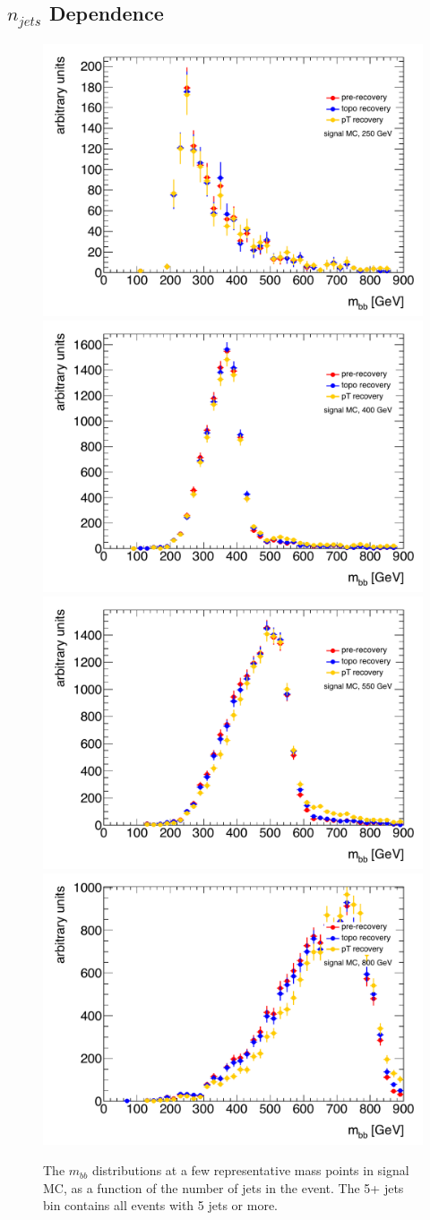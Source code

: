 \subsection{$n_{jets}$ Dependence} 
\begin{figure}[hbt]
  \includegraphics[width=0.45\linewidth]{SignalKin/fsr_recovery_bAbb_250.pdf}
  \includegraphics[width=0.45\linewidth]{SignalKin/fsr_recovery_bAbb_400.pdf}
\newline
  \includegraphics[width=0.45\linewidth]{SignalKin/fsr_recovery_bAbb_550.pdf}
  \includegraphics[width=0.45\linewidth]{SignalKin/fsr_recovery_bAbb_800.pdf}
  \label{fig:mbb_njets_signal}
  \caption{The $m_{bb}$ distributions at a few representative mass points in signal MC, as a function of the number of jets in the event.  
    The 5+ jets bin contains all events with 5 jets or more.}
\end{figure}
